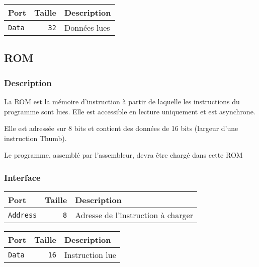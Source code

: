 \documentclass{article}
\begin{document}

    \begin{tabular}{|l|r|l|}
        \hline
        \textbf{Port} & \textbf{Taille} & \textbf{Description} \\
        \hline
        \texttt{Data} & \texttt{32}     & Données lues         \\

        \hline
    \end{tabular}

    \subsection{ROM}

    \subsubsection{Description}

    La ROM est la mémoire d'instruction à partir de laquelle les instructions du programme sont lues.
    Elle est accessible en lecture uniquement et est asynchrone.

    Elle est adressée sur 8 bits et contient des données de 16 bits (largeur d'une instruction Thumb).

    Le programme, assemblé par l'assembleur, devra être chargé dans cette ROM

    \subsubsection{Interface}


    \begin{tabular}{|l|r|l|}
        \hline
        \textbf{Port}    & \textbf{Taille} & \textbf{Description}               \\
        \hline

        \texttt{Address} & \texttt{8}      & Adresse de l'instruction à charger \\

        \hline
    \end{tabular}


    \begin{tabular}{|l|r|l|}
        \hline
        \textbf{Port} & \textbf{Taille} & \textbf{Description} \\
        \hline

        \texttt{Data} & \texttt{16}     & Instruction lue      \\

        \hline
    \end{tabular}


\end{document}

